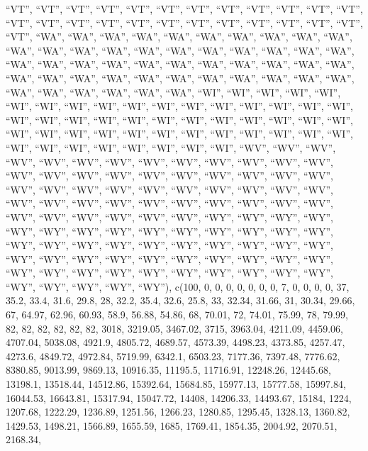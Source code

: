 \documentclass[
]{article}
\begin{document}
``VT'', ``VT'', ``VT'', ``VT'', ``VT'', ``VT'', ``VT'', ``VT'', ``VT'',
``VT'', ``VT'', ``VT'', ``VT'', ``VT'', ``VT'', ``VT'', ``VT'', ``VT'',
``VT'', ``VT'', ``VT'', ``VT'', ``VT'', ``VT'', ``VT'', ``WA'', ``WA'',
``WA'', ``WA'', ``WA'', ``WA'', ``WA'', ``WA'', ``WA'', ``WA'', ``WA'',
``WA'', ``WA'', ``WA'', ``WA'', ``WA'', ``WA'', ``WA'', ``WA'', ``WA'',
``WA'', ``WA'', ``WA'', ``WA'', ``WA'', ``WA'', ``WA'', ``WA'', ``WA'',
``WA'', ``WA'', ``WA'', ``WA'', ``WA'', ``WA'', ``WA'', ``WA'', ``WA'',
``WA'', ``WA'', ``WA'', ``WA'', ``WA'', ``WA'', ``WA'', ``WA'', ``WA'',
``WA'', ``WA'', ``WI'', ``WI'', ``WI'', ``WI'', ``WI'', ``WI'', ``WI'',
``WI'', ``WI'', ``WI'', ``WI'', ``WI'', ``WI'', ``WI'', ``WI'', ``WI'',
``WI'', ``WI'', ``WI'', ``WI'', ``WI'', ``WI'', ``WI'', ``WI'', ``WI'',
``WI'', ``WI'', ``WI'', ``WI'', ``WI'', ``WI'', ``WI'', ``WI'', ``WI'',
``WI'', ``WI'', ``WI'', ``WI'', ``WI'', ``WI'', ``WI'', ``WI'', ``WI'',
``WI'', ``WI'', ``WI'', ``WI'', ``WI'', ``WI'', ``WV'', ``WV'', ``WV'',
``WV'', ``WV'', ``WV'', ``WV'', ``WV'', ``WV'', ``WV'', ``WV'', ``WV'',
``WV'', ``WV'', ``WV'', ``WV'', ``WV'', ``WV'', ``WV'', ``WV'', ``WV'',
``WV'', ``WV'', ``WV'', ``WV'', ``WV'', ``WV'', ``WV'', ``WV'', ``WV'',
``WV'', ``WV'', ``WV'', ``WV'', ``WV'', ``WV'', ``WV'', ``WV'', ``WV'',
``WV'', ``WV'', ``WV'', ``WV'', ``WV'', ``WV'', ``WV'', ``WV'', ``WV'',
``WV'', ``WY'', ``WY'', ``WY'', ``WY'', ``WY'', ``WY'', ``WY'', ``WY'',
``WY'', ``WY'', ``WY'', ``WY'', ``WY'', ``WY'', ``WY'', ``WY'', ``WY'',
``WY'', ``WY'', ``WY'', ``WY'', ``WY'', ``WY'', ``WY'', ``WY'', ``WY'',
``WY'', ``WY'', ``WY'', ``WY'', ``WY'', ``WY'', ``WY'', ``WY'', ``WY'',
``WY'', ``WY'', ``WY'', ``WY'', ``WY'', ``WY'', ``WY'', ``WY'', ``WY'',
``WY'', ``WY'', ``WY'', ``WY'', ``WY''), c(100, 0, 0, 0, 0, 0, 0, 0, 7,
0, 0, 0, 0, 37, 35.2, 33.4, 31.6, 29.8, 28, 32.2, 35.4, 32.6, 25.8, 33,
32.34, 31.66, 31, 30.34, 29.66, 67, 64.97, 62.96, 60.93, 58.9, 56.88,
54.86, 68, 70.01, 72, 74.01, 75.99, 78, 79.99, 82, 82, 82, 82, 82, 82,
3018, 3219.05, 3467.02, 3715, 3963.04, 4211.09, 4459.06, 4707.04,
5038.08, 4921.9, 4805.72, 4689.57, 4573.39, 4498.23, 4373.85, 4257.47,
4273.6, 4849.72, 4972.84, 5719.99, 6342.1, 6503.23, 7177.36, 7397.48,
7776.62, 8380.85, 9013.99, 9869.13, 10916.35, 11195.5, 11716.91,
12248.26, 12445.68, 13198.1, 13518.44, 14512.86, 15392.64, 15684.85,
15977.13, 15777.58, 15997.84, 16044.53, 16643.81, 15317.94, 15047.72,
14408, 14206.33, 14493.67, 15184, 1224, 1207.68, 1222.29, 1236.89,
1251.56, 1266.23, 1280.85, 1295.45, 1328.13, 1360.82, 1429.53, 1498.21,
1566.89, 1655.59, 1685, 1769.41, 1854.35, 2004.92, 2070.51, 2168.34,
\end{document}
